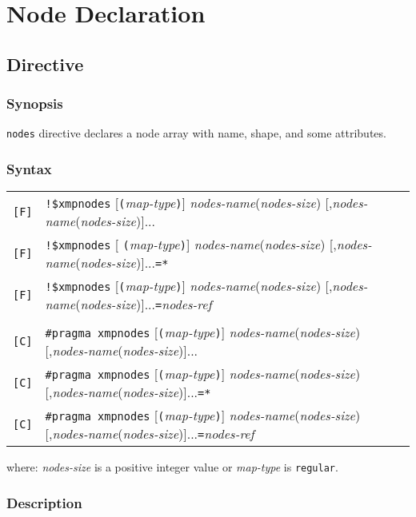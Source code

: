 \section{Node Declaration}

\subsection{ Directive}

\subsubsection*{Synopsis}

{\tt nodes} directive declares a node array with
name, shape, and some attributes.

\subsubsection*{Syntax}
{\small
\begin{tabular}{ll}
\verb![F]!&\verb|!$xmp|{\tt nodes} [{\tt(}{\it map-type}{\tt)}]
{\it nodes-name}({\it nodes-size}) [,{\it nodes-name}({\it nodes-size})]... \\
\verb![F]!&\verb|!$xmp|{\tt nodes} [ {\tt(}{\it map-type}{\tt)}]
{\it nodes-name}({\it nodes-size}) [,{\it nodes-name}({\it nodes-size})]...{\tt =*}\\
\verb![F]!&\verb|!$xmp|{\tt nodes} [{\tt(}{\it map-type}{\tt)}]
{\it nodes-name}({\it nodes-size}) [,{\it nodes-name}({\it nodes-size})]...{\tt =}{\it nodes-ref}\\
& \\
\verb![C]!&\verb|#pragma xmp|{\tt nodes} [{\tt(}{\it map-type}{\tt)}]
{\it nodes-name}({\it nodes-size}) [,{\it nodes-name}({\it nodes-size})]... \\
\verb![C]!&\verb|#pragma xmp|{\tt nodes} [{\tt(}{\it map-type}{\tt)}]
{\it nodes-name}({\it nodes-size}) [,{\it nodes-name}({\it nodes-size})]...{\tt =*} \\
\verb![C]!&\verb|#pragma xmp|{\tt nodes} [{\tt(}{\it map-type}{\tt)}]
{\it nodes-name}({\it nodes-size}) [,{\it nodes-name}({\it nodes-size})]...{\tt =}{\it nodes-ref}\\
\end{tabular}
}
\vspace{0.3cm}

where: {\it nodes-size} is a positive integer value or {\it map-type} is
{\tt regular}.

\subsubsection*{Description}

